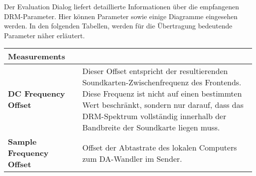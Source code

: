 Der Evaluation Dialog liefert detaillierte Informationen über die empfangenen DRM-Parameter. Hier können Parameter sowie einige Diagramme eingesehen werden. In den folgenden Tabellen, werden für die Übertragung bedeutende Parameter näher erläutert.

\begin{table}[h]
	\begin{center}
		\begin{tabular}{p{0.3\linewidth} | p{0.7\linewidth}}	
			\textbf{Measurements} & \\
			\hline
			\textbf{DC Frequency Offset} & Dieser Offset entspricht der resultierenden Soundkarten-Zwischenfrequenz des Frontends. Diese Frequenz ist nicht auf einen bestimmten Wert beschränkt, sondern nur darauf, dass das DRM-Spektrum vollständig innerhalb der Bandbreite der Soundkarte liegen muss.\\
			
			\textbf{Sample Frequency Offset} & Offset der Abtastrate des lokalen Computers zum DA-Wandler im Sender. \\
			

\end{tabular}
\end{center}
\end{table}
